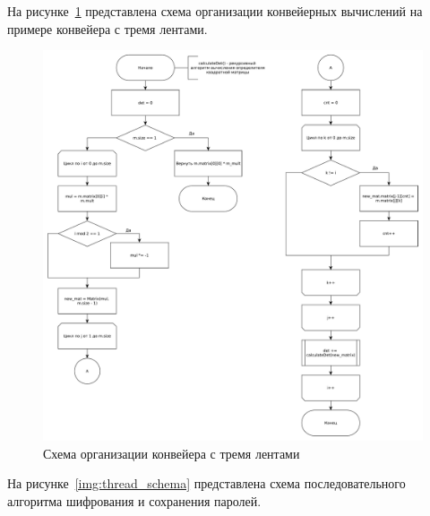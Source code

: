 \documentclass[12pt]{report}
\begin{document}
    На рисунке~\ref{img:count_det} представлена схема организации конвейерных вычислений на примере конвейера с тремя лентами.
    \begin{figure}[H]
    	\centering
    	\includegraphics[width=1.00\linewidth]{img/count_det}
    	\caption{Схема организации конвейера с тремя лентами}
    	\label{img:count_det}
    \end{figure}
    
    На рисунке~\ref{img:thread_schema} представлена схема последовательного алгоритма шифрования и сохранения паролей.
    
\end{document}
